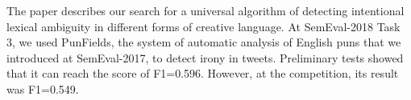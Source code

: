 The paper describes our search for a universal algorithm of detecting intentional lexical ambiguity in different forms of creative language. At SemEval-2018 Task 3, we used PunFields, the system of automatic analysis of English puns that we introduced at SemEval-2017, to detect irony in tweets. Preliminary tests showed that it can reach the score of F1=0.596. However, at the competition, its result was F1=0.549.
